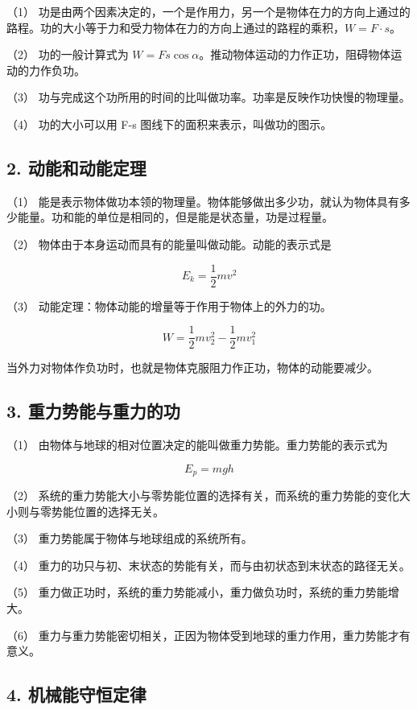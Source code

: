 （1）
功是由两个因素决定的，一个是作用力，另一个是物体在力的方向上通过的路程。功的大小等于力和受力物体在力的方向上通过的路程的乘积，\(W = F \cdot s\)。

（2） 功的一般计算式为
\(W = Fs \cos \alpha\)。推动物体运动的力作正功，阻碍物体运动的力作负功。

（3） 功与完成这个功所用的时间的比叫做功率。功率是反映作功快慢的物理量。

（4） 功的大小可以用 F-s 图线下的面积来表示，叫做功的图示。

\subsection{2.
动能和动能定理}\label{ux52a8ux80fdux548cux52a8ux80fdux5b9aux7406}

（1）
能是表示物体做功本领的物理量。物体能够做出多少功，就认为物体具有多少能量。功和能的单位是相同的，但是能是状态量，功是过程量。

（2） 物体由于本身运动而具有的能量叫做动能。动能的表示式是

\[
E _ {k} = \frac {1}{2} m v ^ {2}
\]

（3） 动能定理：物体动能的增量等于作用于物体上的外力的功。

\[
W = \frac {1}{2} m v _ {2} ^ {2} - \frac {1}{2} m v _ {1} ^ {2}
\]

当外力对物体作负功时，也就是物体克服阻力作正功，物体的动能要减少。

\subsection{3.
重力势能与重力的功}\label{ux91cdux529bux52bfux80fdux4e0eux91cdux529bux7684ux529f}

（1） 由物体与地球的相对位置决定的能叫做重力势能。重力势能的表示式为

\[
E _ {p} = m g h
\]

（2）
系统的重力势能大小与零势能位置的选择有关，而系统的重力势能的变化大小则与零势能位置的选择无关。

（3） 重力势能属于物体与地球组成的系统所有。

（4） 重力的功只与初、末状态的势能有关，而与由初状态到末状态的路径无关。

（5）
重力做正功时，系统的重力势能减小，重力做负功时，系统的重力势能增大。

（6）
重力与重力势能密切相关，正因为物体受到地球的重力作用，重力势能才有意义。

\subsection{4.
机械能守恒定律}\label{ux673aux68b0ux80fdux5b88ux6052ux5b9aux5f8b-1}

